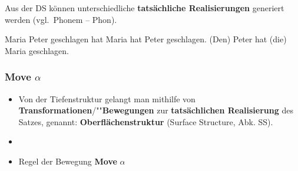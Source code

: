 \begin{frame}
	
	
	\begin{minipage}[b]{.45\textwidth}
		Aus der DS können unterschiedliche \textbf{tatsächliche Realisierungen} generiert werden (vgl.\ Phonem -- Phon).
	\end{minipage}
	\begin{minipage}[b]{0.5\textwidth}
		\centering
	\end{minipage}  
	
	
	\eal
	\ex Maria Peter geschlagen hat
	\ex Maria hat Peter geschlagen.
	\ex (Den) Peter hat (die) Maria geschlagen.
	\zl
	
\end{frame}


\begin{frame}
	\frametitle{Move $\alpha$}
	
	\begin{itemize}
		\item Von der Tiefenstruktur gelangt man mithilfe von \textbf{Transformationen}/""\textbf{Bewegungen} zur \textbf{tatsächlichen Realisierung} des Satzes, genannt: \textbf{Oberflächenstruktur} (Surface Structure, Abk. SS).
		\item[]
		\item Regel der Bewegung \ras \textbf{Move} $\alpha$
	\end{itemize}
	
\end{frame}


